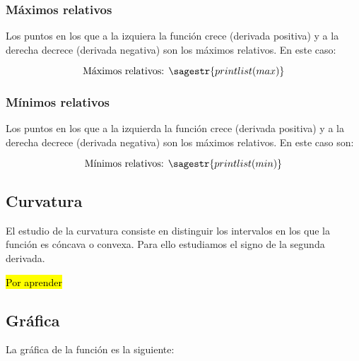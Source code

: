 
\subsubsection{Máximos relativos}
\ifverbose
Los puntos en los que a la izquiera la función crece (derivada positiva) y a la derecha decrece (derivada negativa) son los máximos relativos. En este caso: 
\fi

\[\text{Máximos relativos: } \sagestr{printlist(max)}\]

\subsubsection{Mínimos relativos}
\ifverbose
Los puntos en los que a la izquierda la función crece (derivada positiva) y a la derecha decrece (derivada negativa) son los máximos relativos. En este caso son: 
\fi

\[\text{Mínimos relativos: }\sagestr{printlist(min)}\]


\subsection{Curvatura}

\ifverbose
El estudio de la curvatura consiste en distinguir los intervalos en los que la función es cóncava o convexa. Para ello estudiamos el signo de la segunda derivada.
\fi

\hl{Por aprender}

\subsection{Gráfica}

La gráfica de la función es la siguiente:

